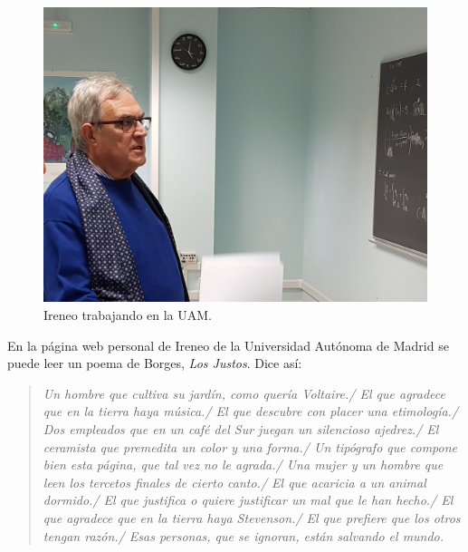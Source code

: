 \begin{figure}[h]
\begin{center}
\includegraphics[width=0.7\linewidth]{IP_foto_UAM.jpg}
\caption{Ireneo trabajando en la UAM.}
\end{center}
\end{figure}

En la p\'agina web personal de Ireneo de la Universidad Aut\'onoma de Madrid se puede leer un poema de Borges,  {\it  Los Justos}.  Dice as\'i:

\begin{quote}
\textit{
Un hombre que cultiva su jard\'in, como quer\'ia Voltaire./
    El que agradece que en la tierra haya m\'usica./
    El que descubre con placer una etimolog\'ia./
    Dos empleados que en un caf\'e del Sur juegan un silencioso ajedrez./
    El ceramista que premedita un color y una forma./
    Un tip\'ografo que compone bien esta p\'agina, que tal vez no le agrada./
    Una mujer y un hombre que leen los tercetos finales de cierto canto./
    El que acaricia a un animal dormido./
    El que justifica o quiere justificar un mal que le han hecho./
    El que agradece que en la tierra haya Stevenson./
    El que prefiere que los otros tengan raz\'on./
    Esas personas, que se ignoran, est\'an salvando el mundo.
  }
 \end{quote}



